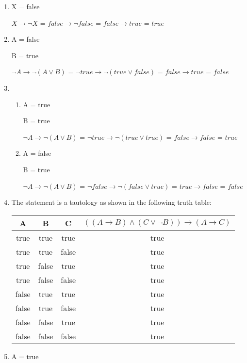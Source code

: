 \documentclass{article}
\begin{document}
\begin{enumerate}
\begin{enumerate}
        \item
        X = false

        $X \rightarrow \neg X$ = $false \rightarrow \neg false$ = $false \rightarrow true$ = $true$
        \item
        A = false

        B = true

        $\neg A \rightarrow \neg (A \lor B)$ = $\neg true \rightarrow \neg (true \lor false)$ = $false \rightarrow true$ = $false$
        \item
        \begin{enumerate}
            \item
            A = true

            B = true

            $\neg A \rightarrow \neg (A \lor B)$ = $\neg true \rightarrow \neg (true \lor true)$ = $false \rightarrow false$ = $true$

            \item
            A = false

            B = true

            $\neg A \rightarrow \neg (A \lor B)$ = $\neg false \rightarrow \neg (false \lor true)$ = $true \rightarrow false$ = $false$
        \end{enumerate}
        \item
        The statement is a tautology as shown in the following truth table:

        \begin{tabular}{| c | c | c | c |}
            \hline
            A & B & C & $((A \rightarrow B) \land (C \lor \neg B)) \rightarrow (A \rightarrow C)$ \\
            \hline
            true & true & true & true \\
            \hline
            true & true & false & true \\
            \hline
            true & false & true & true \\
            \hline
            true & false & false & true \\
            \hline
            false & true & true & true \\
            \hline
            false & true & false & true \\
            \hline
            false & false & true & true \\
            \hline
            false & false & false & true \\
            \hline
        \end{tabular}
        \item
        A = true


\end{enumerate}
\end{enumerate}
\end{document}

